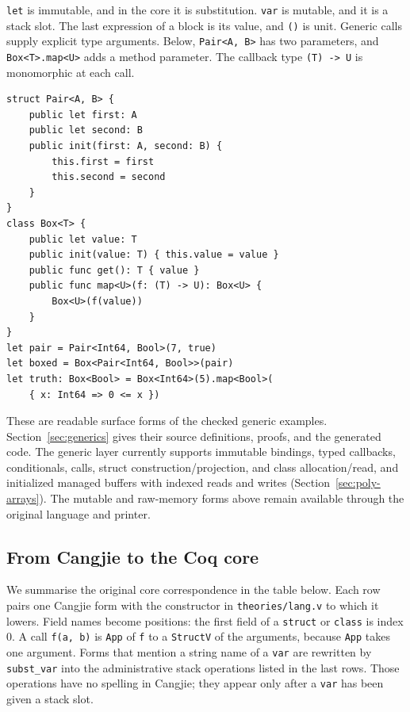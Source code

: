 \documentclass[11pt]{article}
\begin{document}
\texttt{let} is immutable, and in the core it is substitution.
\texttt{var} is mutable, and it is a stack slot.
The last expression of a block is its value, and \texttt{()} is unit.
Generic calls supply explicit type arguments. Below, \texttt{Pair<A, B>}
has two parameters, and \texttt{Box<T>.map<U>} adds a method parameter.
The callback type \texttt{(T) -> U} is monomorphic at each call.

\noindent\begin{minipage}{\linewidth}
\begin{lstlisting}
struct Pair<A, B> {
    public let first: A
    public let second: B
    public init(first: A, second: B) {
        this.first = first
        this.second = second
    }
}
class Box<T> {
    public let value: T
    public init(value: T) { this.value = value }
    public func get(): T { value }
    public func map<U>(f: (T) -> U): Box<U> {
        Box<U>(f(value))
    }
}
let pair = Pair<Int64, Bool>(7, true)
let boxed = Box<Pair<Int64, Bool>>(pair)
let truth: Box<Bool> = Box<Int64>(5).map<Bool>(
    { x: Int64 => 0 <= x })
\end{lstlisting}
\end{minipage}

These are readable surface forms of the checked generic examples.
Section~\ref{sec:generics} gives their source definitions, proofs, and the
generated code. The generic layer currently supports immutable bindings,
typed callbacks, conditionals, calls, struct construction/projection, and
class allocation/read, and initialized managed buffers with indexed reads
and writes (Section~\ref{sec:poly-arrays}). The mutable and raw-memory forms above remain
available through the original language and printer.

\subsection{From Cangjie to the Coq core}

We summarise the original core correspondence in the table below.
Each row pairs one Cangjie form with the constructor in \texttt{theories/lang.v} to which it lowers.
Field names become positions: the first field of a \texttt{struct} or \texttt{class} is index \(0\).
A call \texttt{f(a, b)} is \texttt{App} of \texttt{f} to a \texttt{StructV} of the arguments, because \texttt{App} takes one argument.
Forms that mention a string name of a \texttt{var} are rewritten by \texttt{subst\_var} into the administrative stack operations listed in the last rows.
Those operations have no spelling in Cangjie; they appear only after a \texttt{var} has been given a stack slot.
\end{document}
